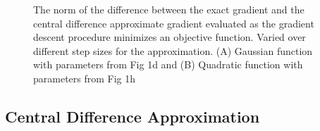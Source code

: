 \documentclass[10pt, twocolumn]{article}
\begin{document}
\begin{figure}[!h]
\centering
{}

\caption{The norm of the difference between the exact gradient and the central difference approximate gradient evaluated as the gradient descent procedure minimizes an objective function. Varied over different step sizes for the approximation. (A) Gaussian function with parameters from Fig 1d and (B) Quadratic function with parameters from Fig 1h}
\label{fig:1.2}
\end{figure}


\subsection{Central Difference Approximation}
\end{document}
